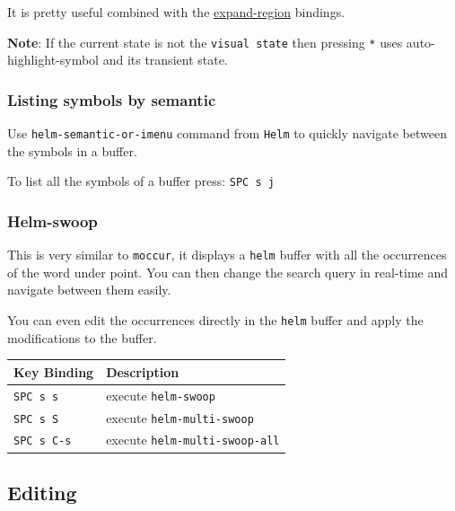 \documentclass[11pt]{article}
\begin{document}
It is pretty useful combined with the \hyperref[sec:orgb53a718]{expand-region} bindings.

\textbf{Note}: If the current state is not the \texttt{visual state} then pressing \texttt{*} uses
auto-highlight-symbol and its transient state.

\subsubsection{Listing symbols by semantic}
\label{sec:org08caff8}
Use \texttt{helm-semantic-or-imenu} command from \texttt{Helm} to quickly navigate between the
symbols in a buffer.

To list all the symbols of a buffer press: \texttt{SPC s j}

\subsubsection{Helm-swoop}
\label{sec:orgc2af4d7}
This is very similar to \texttt{moccur}, it displays a \texttt{helm} buffer with all the
occurrences of the word under point. You can then change the search query in
real-time and navigate between them easily.

You can even edit the occurrences directly in the \texttt{helm} buffer and apply the
modifications to the buffer.

\begin{center}
\begin{tabular}{ll}
Key Binding & Description\\
\hline
\texttt{SPC s s} & execute \texttt{helm-swoop}\\
\texttt{SPC s S} & execute \texttt{helm-multi-swoop}\\
\texttt{SPC s C-s} & execute \texttt{helm-multi-swoop-all}\\
\end{tabular}
\end{center}

\subsection{Editing}
\label{sec:orga8db2c5}
\end{document}
